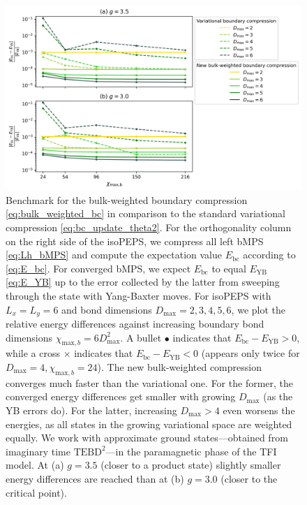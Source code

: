 \begin{figure}[H]
  \centering
  \includegraphics[width=1.0\linewidth]{boundary_compression_6_6.png}
  \caption{Benchmark for the bulk-weighted boundary compression \eqref{eq:bulk_weighted_bc} in comparison to the standard variational compression \eqref{eq:bc_update_theta2}. For the orthogonality column on the right side of the isoPEPS, we compress all left bMPS \eqref{eq:Lh_bMPS} and compute the expectation value $E_{\text{bc}}$ according to \eqref{eq:E_bc}. For converged bMPS, we expect $E_{\text{bc}}$ to equal $E_{\text{YB}}$ \eqref{eq:E_YB} up to the error collected by the latter from sweeping through the state with Yang-Baxter moves. For isoPEPS with $L_x = L_y = 6$ and bond dimensions $D_{\text{max}} = 2, 3, 4, 5, 6$, we plot the relative energy differences against increasing boundary bond dimensions $\chi_{\text{max},b} = 6D_{\text{max}}^2$. A bullet $\bullet$ indicates that $E_{\text{bc}} - E_{\text{YB}} > 0$, while a cross $\times$ indicates that $E_{\text{bc}} - E_{\text{YB}} < 0$ (appears only twice for $D_{\text{max}} = 4, \chi_{\text{max},b} = 24$). The new bulk-weighted compression converges much faster than the variational one. For the former, the converged energy differences get smaller with growing $D_{\text{max}}$ (as the YB errors do). For the latter, increasing $D_{\text{max}} > 4$ even worsens the energies, as all states in the growing variational space are weighted equally. We work with approximate ground states---obtained from imaginary time $\text{TEBD}^2$---in the paramagnetic phase of the TFI model. At (a) $g = 3.5$ (closer to a product state) slightly smaller energy differences are reached than at (b) $g = 3.0$ (closer to the critical point).}
\label{fig:bc}
\end{figure}

